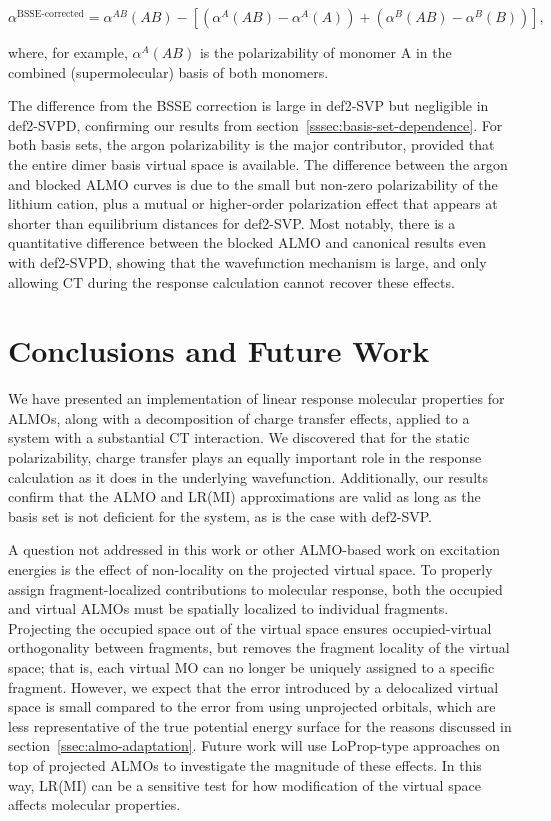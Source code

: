 \begin{equation}
  \alpha^{\text{BSSE-corrected}} = \alpha^{AB}(AB) - \left[ \left( \alpha^{A}(AB) - \alpha^{A}(A) \right) + \left( \alpha^{B}(AB) - \alpha^{B}(B) \right) \right],
  \label{eq:bsse-corrected-polarizability}
\end{equation}

where, for example, \(\alpha^{A}(AB)\) is the polarizability of monomer A in the combined (supermolecular) basis of both monomers.

The difference from the BSSE correction is large in def2-SVP but negligible in def2-SVPD, confirming our results from section~\ref{sssec:basis-set-dependence}. For both basis sets, the argon polarizability is the major contributor, provided that the entire dimer basis virtual space is available. The difference between the argon and blocked ALMO curves is due to the small but non-zero polarizability of the lithium cation, plus a mutual or higher-order polarization effect that appears at shorter than equilibrium distances for def2-SVP. Most notably, there is a quantitative difference between the blocked ALMO and canonical results even with def2-SVPD, showing that the wavefunction mechanism is large, and only allowing CT during the response calculation cannot recover these effects.

\section{Conclusions and Future Work}
\label{sec:conclusions-and-future-work}

We have presented an implementation of linear response molecular properties for ALMOs, along with a decomposition of charge transfer effects, applied to a system with a substantial CT interaction. We discovered that for the static polarizability, charge transfer plays an equally important role in the response calculation as it does in the underlying wavefunction. Additionally, our results confirm that the ALMO and LR(MI) approximations are valid as long as the basis set is not deficient for the system, as is the case with def2-SVP.

A question not addressed in this work or other ALMO-based work on excitation energies\cite{Closser_2015_5791,doi:10.1063/1.4926837} is the effect of non-locality on the projected virtual space. To properly assign fragment-localized contributions to molecular response, both the occupied and virtual ALMOs must be spatially localized to individual fragments. Projecting the occupied space out of the virtual space ensures occupied-virtual orthogonality between fragments, but removes the fragment locality of the virtual space; that is, each virtual MO can no longer be uniquely assigned to a specific fragment. However, we expect that the error introduced by a delocalized virtual space is small compared to the error from using unprojected orbitals, which are less representative of the true potential energy surface for the reasons discussed in section~\ref{ssec:almo-adaptation}. Future work will use LoProp-type approaches on top of projected ALMOs to investigate the magnitude of these effects. In this way, LR(MI) can be a sensitive test for how modification of the virtual space affects molecular properties.

